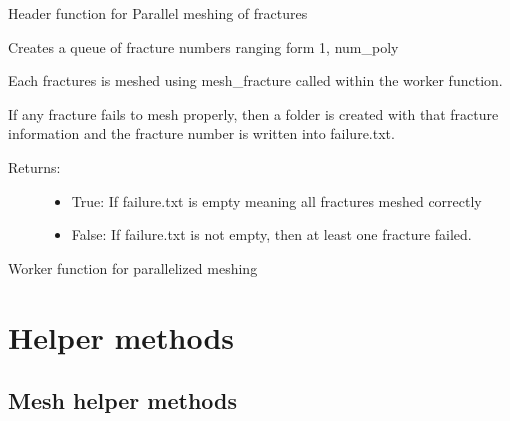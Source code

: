\documentclass[letterpaper,10pt,english]{sphinxmanual}
\begin{document}

\begin{fulllineitems}
\label{pydfnworks:pydfnworks.run_meshing.mesh_fractures_header}
Header function for Parallel meshing of fractures

Creates a queue of fracture numbers ranging form 1, num\_poly

Each fractures is meshed using mesh\_fracture called within the
worker function.

If any fracture fails to mesh properly, then a folder is created with 
that fracture information and the fracture number is written into
failure.txt.
\begin{description}
\item[{Returns:}] \leavevmode\begin{itemize}
\item {} 
True: If failure.txt is empty meaning all fractures meshed correctly

\item {} 
False: If failure.txt is not empty, then at least one fracture failed.

\end{itemize}

\end{description}

\end{fulllineitems}


\begin{fulllineitems}
\label{pydfnworks:pydfnworks.run_meshing.worker}
Worker function for parallelized meshing

\end{fulllineitems}



\section{Helper methods}
\label{pydfnworks:helper-methods}

\subsection{Mesh helper methods}
\label{pydfnworks:module-pydfnworks.mesh_dfn_helper}\label{pydfnworks:mesh-helper-methods}\label{pydfnworks:module-mesh_dfn_helper.py}
\end{document}

